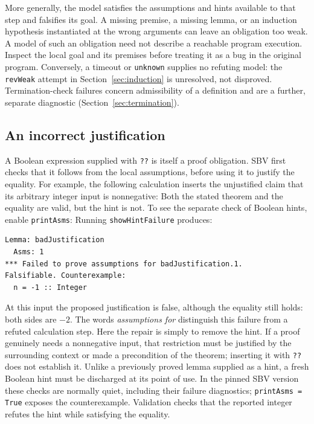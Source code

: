 \documentclass[review]{jfp-epi}
\newcommand{\code}[1]{\texttt{#1}}
\begin{document}
More generally, the model satisfies the assumptions and hints available to that
step and falsifies its goal. A missing premise, a missing lemma, or an induction
hypothesis instantiated at the wrong arguments can leave an obligation too weak.
A model of such an obligation need not describe a reachable program execution.
Inspect the local goal and its premises before treating it as a bug in the
original program. Conversely, a timeout or \code{unknown} supplies no refuting
model: the \code{revWeak} attempt in Section~\ref{sec:induction} is unresolved,
not disproved. Termination-check failures concern admissibility of a definition
and are a further, separate diagnostic (Section~\ref{sec:termination}).

\subsection{An incorrect justification}
\label{sec:bad-hint}

A Boolean expression supplied with \code{??} is itself a proof obligation.
SBV first checks that it follows from the local assumptions, before using it to
justify the equality. For example, the following calculation inserts the
unjustified claim that its arbitrary integer input is nonnegative:
Both the stated theorem and the equality are valid, but the hint is not.
To see the separate check of Boolean hints, enable \code{printAsms}:
Running \code{showHintFailure} produces:
\begin{lstlisting}[style=output]
Lemma: badJustification
  Asms: 1
*** Failed to prove assumptions for badJustification.1.
Falsifiable. Counterexample:
  n = -1 :: Integer
\end{lstlisting}
At this input the proposed justification is false, although the equality still
holds: both sides are $-2$. The words \emph{assumptions for} distinguish this
failure from a refuted calculation step. Here the repair is simply to remove
the hint. If a proof genuinely needs a nonnegative input, that restriction must
be justified by the surrounding context or made a precondition of the theorem;
inserting it with \code{??} does not establish it. Unlike a previously proved
lemma supplied as a hint, a fresh Boolean hint must be discharged at its point
of use. In the pinned SBV version these checks are normally quiet, including
their failure diagnostics; \code{printAsms = True} exposes the counterexample.
Validation checks that the reported integer refutes the hint while satisfying
the equality.
\end{document}
